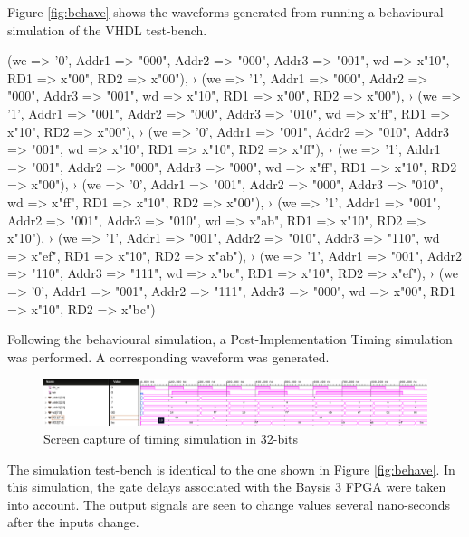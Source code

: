 \documentclass[CMPE]{../KGCOEReport}
\begin{document}
    Figure \ref{fig:behave} shows the waveforms generated from running a behavioural simulation of the VHDL
    test-bench.
    
    (we => '0', Addr1 => "000", Addr2 => "000", Addr3 => "001", wd => x"10", RD1 => x"00", RD2 => x"00"),
›   (we => '1', Addr1 => "000", Addr2 => "000", Addr3 => "001", wd => x"10", RD1 => x"00", RD2 => x"00"),
›   (we => '1', Addr1 => "001", Addr2 => "000", Addr3 => "010", wd => x"ff", RD1 => x"10", RD2 => x"00"),
›   (we => '0', Addr1 => "001", Addr2 => "010", Addr3 => "001", wd => x"10", RD1 => x"10", RD2 => x"ff"),
›   (we => '1', Addr1 => "001", Addr2 => "000", Addr3 => "000", wd => x"ff", RD1 => x"10", RD2 => x"00"),
›   (we => '0', Addr1 => "001", Addr2 => "000", Addr3 => "010", wd => x"ff", RD1 => x"10", RD2 => x"00"),
›   (we => '1', Addr1 => "001", Addr2 => "001", Addr3 => "010", wd => x"ab", RD1 => x"10", RD2 => x"10"),
›   (we => '1', Addr1 => "001", Addr2 => "010", Addr3 => "110", wd => x"ef", RD1 => x"10", RD2 => x"ab"),
›   (we => '1', Addr1 => "001", Addr2 => "110", Addr3 => "111", wd => x"bc", RD1 => x"10", RD2 => x"ef"),
›   (we => '0', Addr1 => "001", Addr2 => "111", Addr3 => "000", wd => x"00", RD1 => x"10", RD2 => x"bc")

    \pagebreak

    Following the behavioural simulation, a Post-Implementation Timing simulation was performed.
    A corresponding waveform was generated.

    \begin{figure}[h!]
        \centering
        \includegraphics[width=\textwidth]{img/synthesis-timing}
        \caption{Screen capture of timing simulation in 32-bits}
        \label{fig:timing}
    \end{figure}

    The simulation test-bench is identical to the one shown in Figure \ref{fig:behave}.
    In this simulation, the gate delays associated with the Baysis 3 FPGA were taken into account.
    The output signals are seen to change values several nano-seconds after the inputs change.
\end{document}
